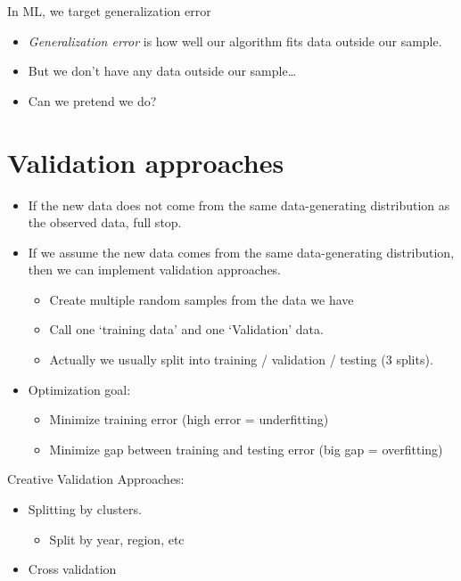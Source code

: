 \documentclass[fontset=fandol,zihao=false,scheme=chinese,heading=true,UTF8]{ctexbook}
\providecommand{\tightlist}{%
  \setlength{\itemsep}{0pt}\setlength{\parskip}{0pt}}
\begin{document}
In ML, we target generalization error

\begin{itemize}
\tightlist
\item
  \emph{Generalization error} is how well our algorithm fits data outside our sample.
\item
  But we don't have any data outside our sample\ldots{}
\item
  Can we pretend we do?
\end{itemize}

\hypertarget{validation-approaches}{%
\section{Validation approaches}\label{validation-approaches}}

\begin{itemize}
\tightlist
\item
  If the new data does not come from the same data-generating distribution as the observed data, full stop.
\item
  If we assume the new data comes from the same data-generating distribution, then we can implement validation approaches.

  \begin{itemize}
  \tightlist
  \item
    Create multiple random samples from the data we have
  \item
    Call one `training data' and one `Validation' data.
  \item
    Actually we usually split into training / validation / testing (3 splits).
  \end{itemize}
\item
  Optimization goal:

  \begin{itemize}
  \tightlist
  \item
    Minimize training error (high error = underfitting)
  \item
    Minimize gap between training and testing error (big gap = overfitting)
  \end{itemize}
\end{itemize}

Creative Validation Approaches:

\begin{itemize}
\tightlist
\item
  Splitting by clusters.

  \begin{itemize}
  \tightlist
  \item
    Split by year, region, etc
  \end{itemize}
\item
  Cross validation
\end{itemize}
\end{document}
